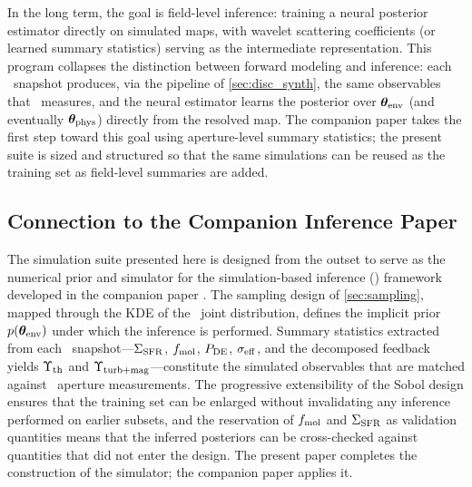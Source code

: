 In the long term, the goal is field-level inference: training a neural
posterior estimator directly on simulated maps, with wavelet scattering
coefficients (or learned summary statistics) serving as the
intermediate representation. This program collapses the distinction
between forward modeling and inference: each \TIGRESS\ snapshot
produces, via the pipeline of \autoref{sec:disc_synth}, the same
observables that \PHANGS\ measures, and the neural estimator learns the
posterior over $\boldsymbol{\theta}_{\rm env}$ (and eventually $\boldsymbol{\theta}_{\rm phys}$) directly from
the resolved map. The companion paper takes the first step toward this
goal using aperture-level summary statistics; the present suite is sized
and structured so that the same simulations can be reused as the
training set as field-level summaries are added.

\subsection{Connection to the Companion Inference Paper}
\label{sec:disc_paperII}

The simulation suite presented here is designed from the outset to
serve as the numerical prior and simulator for the simulation-based
inference (\SBI) framework developed in the companion paper
. The
sampling design of \autoref{sec:sampling}, mapped through the KDE of
the \PHANGS\ joint distribution, defines the implicit prior $p(\boldsymbol{\theta}_{\rm env})$
under which the inference is performed. Summary statistics extracted
from each \TIGRESS\ snapshot---$\Sigma_{\rm SFR}$, $f_{\rm mol}$, $P_{\rm DE}$, $\sigma_{\rm eff}$, and
the decomposed feedback yields $\Upsilon_{\rm th}$ and $\Upsilon_{\rm turb+mag}$---constitute the
simulated observables that are matched against \PHANGS\ aperture
measurements. The progressive extensibility of the Sobol design ensures
that the training set can be enlarged without invalidating any inference
performed on earlier subsets, and the reservation of $f_{\rm mol}$ and
$\Sigma_{\rm SFR}$ as validation quantities means that the inferred posteriors can
be cross-checked against quantities that did not enter the design. The
present paper completes the construction of the simulator; the
companion paper applies it.
